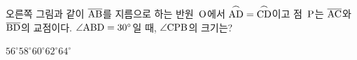 \noindent\begin{minipage}[t]{0.58\linewidth}\vspace{0pt}\raggedright 오른쪽 그림과 같이 $\overline{\mathrm{AB}}$를 지름으로 하는 반원~$\mathrm{O}$에서 $\overset{\frown}{\mathrm{AD}}=\overset{\frown}{\mathrm{CD}}$이고 점~$\mathrm{P}$는 $\overline{\mathrm{AC}}$와 $\overline{\mathrm{BD}}$의 교점이다. $\angle\mathrm{ABD}=30^\circ$일 때, $\angle\mathrm{CPB}$의 크기는?\end{minipage}\hfill\begin{minipage}[t]{0.4\linewidth}\vspace{0pt}\centering \resizebox{\ifdim\width>\linewidth\linewidth\else\width\fi}{!}{}\end{minipage}\par
\begin{choices32}{$56^\circ$}{$58^\circ$}{$60^\circ$}{$62^\circ$}{$64^\circ$}\end{choices32}

